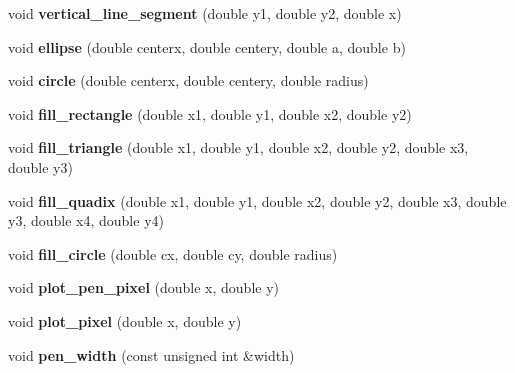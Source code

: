 \begin{DoxyCompactItemize}
void {\bfseries vertical\+\_\+line\+\_\+segment} (double y1, double y2, double x)
\item 
\mbox{\label{classcartesian__canvas_acfbecba8726cdfb4e49f59ae004c8e7e}} 
void {\bfseries ellipse} (double centerx, double centery, double a, double b)
\item 
\mbox{\label{classcartesian__canvas_ae8ffa45dba740a054cd8891921fc17ed}} 
void {\bfseries circle} (double centerx, double centery, double radius)
\item 
\mbox{\label{classcartesian__canvas_aa09052f204a0c871af813c61235afd1a}} 
void {\bfseries fill\+\_\+rectangle} (double x1, double y1, double x2, double y2)
\item 
\mbox{\label{classcartesian__canvas_ab0aabcd86a4fef93d770610bfcbce759}} 
void {\bfseries fill\+\_\+triangle} (double x1, double y1, double x2, double y2, double x3, double y3)
\item 
\mbox{\label{classcartesian__canvas_a968197e3001b6d446abe0c72ca3c8ead}} 
void {\bfseries fill\+\_\+quadix} (double x1, double y1, double x2, double y2, double x3, double y3, double x4, double y4)
\item 
\mbox{\label{classcartesian__canvas_a82dbce50daff7c8d07454d667a07685a}} 
void {\bfseries fill\+\_\+circle} (double cx, double cy, double radius)
\item 
\mbox{\label{classcartesian__canvas_adfe076250e3f19e130d53249c56ddace}} 
void {\bfseries plot\+\_\+pen\+\_\+pixel} (double x, double y)
\item 
\mbox{\label{classcartesian__canvas_a3109af0408465c9ab29d5a33ee3d92b3}} 
void {\bfseries plot\+\_\+pixel} (double x, double y)
\item 
\mbox{\label{classcartesian__canvas_aac7eb562b7a50b17d977fe0628738985}} 
void {\bfseries pen\+\_\+width} (const unsigned int \&width)
\item 
\mbox{\label{classcartesian__canvas_a9498916d2d72c9cdb9512a9c1b81862d}} 

\end{DoxyCompactItemize}
